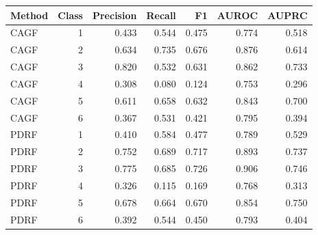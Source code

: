 \begin{tabular}{lrrrrrr}
\toprule
Method & Class & Precision & Recall & F1 & AUROC & AUPRC\\
\midrule
CAGF & 1 & 0.433 & 0.544 & 0.475 & 0.774 & 0.518\\
CAGF & 2 & 0.634 & 0.735 & 0.676 & 0.876 & 0.614\\
CAGF & 3 & 0.820 & 0.532 & 0.631 & 0.862 & 0.733\\
CAGF & 4 & 0.308 & 0.080 & 0.124 & 0.753 & 0.296\\
CAGF & 5 & 0.611 & 0.658 & 0.632 & 0.843 & 0.700\\
CAGF & 6 & 0.367 & 0.531 & 0.421 & 0.795 & 0.394\\
PDRF & 1 & 0.410 & 0.584 & 0.477 & 0.789 & 0.529\\
PDRF & 2 & 0.752 & 0.689 & 0.717 & 0.893 & 0.737\\
PDRF & 3 & 0.775 & 0.685 & 0.726 & 0.906 & 0.746\\
PDRF & 4 & 0.326 & 0.115 & 0.169 & 0.768 & 0.313\\
PDRF & 5 & 0.678 & 0.664 & 0.670 & 0.854 & 0.750\\
PDRF & 6 & 0.392 & 0.544 & 0.450 & 0.793 & 0.404\\
\bottomrule
\end{tabular}
